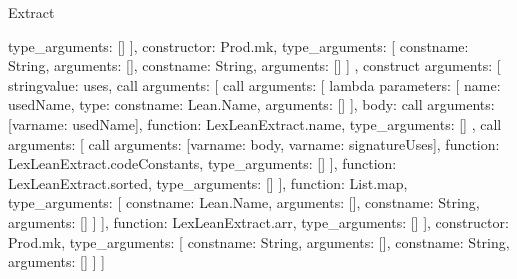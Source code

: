 \begin{lexlean}{Extract}
\begin{toolingmodule}
{{{{{{{{{                            type_arguments: []
                          }
                        ],
                        constructor: Prod.mk,
                        type_arguments: [
                          const{name: String, arguments: []},
                          const{name: String, arguments: []}
                        ]
                      },
                      construct{
                        arguments: [
                          string{value: uses},
                          call{
                            arguments: [
                              call{
                                arguments: [
                                  lambda{
                                    parameters: [
                                      {name: usedName, type: const{name: Lean.Name, arguments: []}}
                                    ],
                                    body: call{
                                      arguments: [var{name: usedName}],
                                      function: LexLeanExtract.name,
                                      type_arguments: []
                                    }
                                  },
                                  call{
                                    arguments: [
                                      call{
                                        arguments: [var{name: body}, var{name: signatureUses}],
                                        function: LexLeanExtract.codeConstants,
                                        type_arguments: []
                                      }
                                    ],
                                    function: LexLeanExtract.sorted,
                                    type_arguments: []
                                  }
                                ],
                                function: List.map,
                                type_arguments: [
                                  const{name: Lean.Name, arguments: []},
                                  const{name: String, arguments: []}
                                ]
                              }
                            ],
                            function: LexLeanExtract.arr,
                            type_arguments: []
                          }
                        ],
                        constructor: Prod.mk,
                        type_arguments: [
                          const{name: String, arguments: []},
                          const{name: String, arguments: []}
                        ]
                      }
                    ]
}}}}}}}
\end{toolingmodule}
\end{lexlean}
